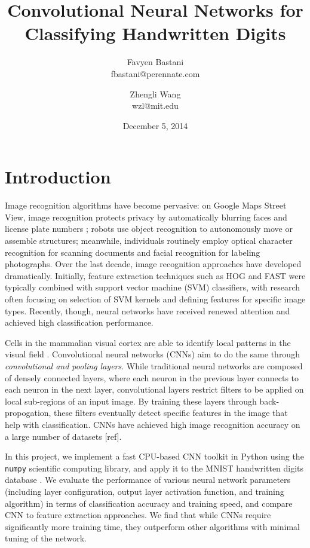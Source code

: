 \documentclass[10pt,twocolumn]{article}
\title{Convolutional Neural Networks for Classifying Handwritten Digits}
\date{December 5, 2014}
\author{
	Favyen Bastani \\
	fbastani@perennate.com
	\and
	Zhengli Wang \\
	wzl@mit.edu
}
\begin{document}
\maketitle

\section{Introduction} \label{sec:introduction}

Image recognition algorithms have become pervasive: on Google Maps Street View, image recognition protects privacy by automatically blurring faces and license plate numbers \cite{streetview}; robots use object recognition to autonomously move or assemble structures; meanwhile, individuals routinely employ optical character recognition for scanning documents and facial recognition for labeling photographs. Over the last decade, image recognition approaches have developed dramatically. Initially, feature extraction techniques such as HOG and FAST were typically combined with support vector machine (SVM) classifiers, with research often focusing on selection of SVM kernels and defining features for specific image types. Recently, though, neural networks have received renewed attention and achieved high classification performance.

Cells in the mammalian visual cortex are able to identify local patterns in the visual field \cite{website:lenet}. Convolutional neural networks (CNNs) aim to do the same through \emph{convolutional and pooling layers}. While traditional neural networks are composed of densely connected layers, where each neuron in the previous layer connects to each neuron in the next layer, convolutional layers restrict filters to be applied on local sub-regions of an input image. By training these layers through back-propogation, these filters eventually detect specific features in the image that help with classification. CNNs have achieved high image recognition accuracy on a large number of datasets [ref].

In this project, we implement a fast CPU-based CNN toolkit \cite{git:cnn} in Python using the \texttt{numpy} scientific computing library, and apply it to the MNIST handwritten digits database \cite{mnist}. We evaluate the performance of various neural network parameters (including layer configuration, output layer activation function, and training algorithm) in terms of classification accuracy and training speed, and compare CNN to feature extraction approaches. We find that while CNNs require significantly more training time, they outperform other algorithms with minimal tuning of the network.
\end{document}
